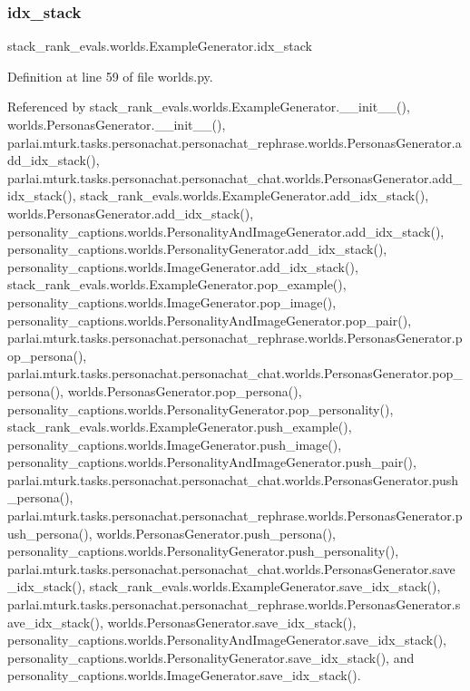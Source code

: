 \subsubsection{\texorpdfstring{idx\+\_\+stack}{idx\_stack}}
{\footnotesize\ttfamily stack\+\_\+rank\+\_\+evals.\+worlds.\+Example\+Generator.\+idx\+\_\+stack}



Definition at line 59 of file worlds.\+py.



Referenced by stack\+\_\+rank\+\_\+evals.\+worlds.\+Example\+Generator.\+\_\+\+\_\+init\+\_\+\+\_\+(), worlds.\+Personas\+Generator.\+\_\+\+\_\+init\+\_\+\+\_\+(), parlai.\+mturk.\+tasks.\+personachat.\+personachat\+\_\+rephrase.\+worlds.\+Personas\+Generator.\+add\+\_\+idx\+\_\+stack(), parlai.\+mturk.\+tasks.\+personachat.\+personachat\+\_\+chat.\+worlds.\+Personas\+Generator.\+add\+\_\+idx\+\_\+stack(), stack\+\_\+rank\+\_\+evals.\+worlds.\+Example\+Generator.\+add\+\_\+idx\+\_\+stack(), worlds.\+Personas\+Generator.\+add\+\_\+idx\+\_\+stack(), personality\+\_\+captions.\+worlds.\+Personality\+And\+Image\+Generator.\+add\+\_\+idx\+\_\+stack(), personality\+\_\+captions.\+worlds.\+Personality\+Generator.\+add\+\_\+idx\+\_\+stack(), personality\+\_\+captions.\+worlds.\+Image\+Generator.\+add\+\_\+idx\+\_\+stack(), stack\+\_\+rank\+\_\+evals.\+worlds.\+Example\+Generator.\+pop\+\_\+example(), personality\+\_\+captions.\+worlds.\+Image\+Generator.\+pop\+\_\+image(), personality\+\_\+captions.\+worlds.\+Personality\+And\+Image\+Generator.\+pop\+\_\+pair(), parlai.\+mturk.\+tasks.\+personachat.\+personachat\+\_\+rephrase.\+worlds.\+Personas\+Generator.\+pop\+\_\+persona(), parlai.\+mturk.\+tasks.\+personachat.\+personachat\+\_\+chat.\+worlds.\+Personas\+Generator.\+pop\+\_\+persona(), worlds.\+Personas\+Generator.\+pop\+\_\+persona(), personality\+\_\+captions.\+worlds.\+Personality\+Generator.\+pop\+\_\+personality(), stack\+\_\+rank\+\_\+evals.\+worlds.\+Example\+Generator.\+push\+\_\+example(), personality\+\_\+captions.\+worlds.\+Image\+Generator.\+push\+\_\+image(), personality\+\_\+captions.\+worlds.\+Personality\+And\+Image\+Generator.\+push\+\_\+pair(), parlai.\+mturk.\+tasks.\+personachat.\+personachat\+\_\+chat.\+worlds.\+Personas\+Generator.\+push\+\_\+persona(), parlai.\+mturk.\+tasks.\+personachat.\+personachat\+\_\+rephrase.\+worlds.\+Personas\+Generator.\+push\+\_\+persona(), worlds.\+Personas\+Generator.\+push\+\_\+persona(), personality\+\_\+captions.\+worlds.\+Personality\+Generator.\+push\+\_\+personality(), parlai.\+mturk.\+tasks.\+personachat.\+personachat\+\_\+chat.\+worlds.\+Personas\+Generator.\+save\+\_\+idx\+\_\+stack(), stack\+\_\+rank\+\_\+evals.\+worlds.\+Example\+Generator.\+save\+\_\+idx\+\_\+stack(), parlai.\+mturk.\+tasks.\+personachat.\+personachat\+\_\+rephrase.\+worlds.\+Personas\+Generator.\+save\+\_\+idx\+\_\+stack(), worlds.\+Personas\+Generator.\+save\+\_\+idx\+\_\+stack(), personality\+\_\+captions.\+worlds.\+Personality\+And\+Image\+Generator.\+save\+\_\+idx\+\_\+stack(), personality\+\_\+captions.\+worlds.\+Personality\+Generator.\+save\+\_\+idx\+\_\+stack(), and personality\+\_\+captions.\+worlds.\+Image\+Generator.\+save\+\_\+idx\+\_\+stack().

